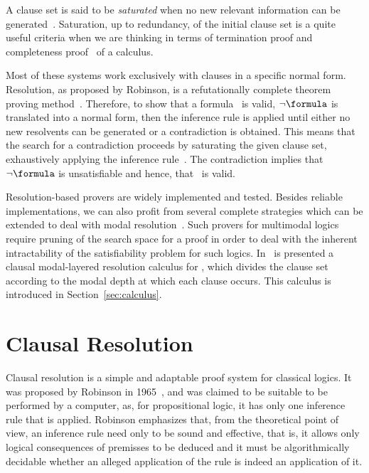 A clause set is said to be \emph{saturated} when no new relevant information can
be generated~\cite{dershowitz2003abstract}. Saturation, up to redundancy, of the
initial clause set is a quite useful criteria when we are thinking in terms of
termination proof and completeness proof~\cite{fitting} of a calculus.

Most of these systems work exclusively with clauses in a specific
normal form. Resolution, as proposed by Robinson, is a refutationally complete
theorem proving method~\cite{Robinson65}.
Therefore, to show that a formula \formula~is valid, $\neg \formula$ is
translated into a normal form, then the inference rule is applied until either
no new resolvents can be generated or a contradiction is obtained. This means
that the search for a contradiction proceeds by saturating the given
clause set, exhaustively applying the inference
rule~\cite{bachmair2001resolution}. The contradiction implies that $\neg
\formula$ is unsatisfiable and hence, that \formula~is valid. 

Resolution-based provers are widely implemented and tested. Besides reliable
implementations, we can also profit from several complete strategies which can
be extended to deal with modal resolution~\cite{journals/jal/NalonD07}. Such
provers for multimodal logics require pruning of the search space for a proof in
order to deal with the inherent intractability of the satisfiability problem for
such logics. In~\cite{nalon2015modal} is presented a clausal modal-layered
resolution calculus for , which divides the clause set according
to the modal depth at which each clause occurs. This calculus is introduced in
Section~\ref{sec:calculus}.

\section{Clausal Resolution}

Clausal resolution is a simple and adaptable proof system for classical logics.
It was proposed by Robinson in 1965~\cite{Robinson65}, and was claimed to be
suitable to be performed by a computer, as, for propositional logic, it has only
one inference rule that is applied. Robinson emphasizes that, from the
theoretical point of view, an inference rule need only to be sound and
effective, that is, it allows only logical consequences of premisses to be
deduced and it must be algorithmically decidable whether an alleged application
of the rule is indeed an application of it.

